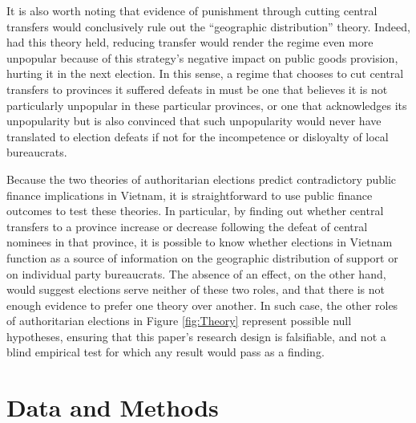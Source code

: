 \documentclass[12pt]{article}\usepackage[]{graphicx}\usepackage[]{color}
\newcommand{\1}{\mathbbm{1}}
\begin{document}
It is also worth noting that evidence of punishment through cutting central transfers would conclusively rule out the ``geographic distribution'' theory. Indeed, had this theory held, reducing transfer would render the regime even more unpopular because of this strategy's negative impact on public goods provision, hurting it in the next election. In this sense, a regime that chooses to cut central transfers to provinces it suffered defeats in must be one that believes it is not particularly unpopular in these particular provinces, or one that acknowledges its unpopularity but is also convinced that such unpopularity would never have translated to election defeats if not for the incompetence or disloyalty of local bureaucrats.

Because the two theories of authoritarian elections predict contradictory public finance implications in Vietnam, it is straightforward to use public finance outcomes to test these theories. In particular, by finding out whether central transfers to a province increase or decrease following the defeat of central nominees in that province, it is possible to know whether elections in Vietnam function as a source of information on the geographic distribution of support or on individual party bureaucrats. The absence of an effect, on the other hand, would suggest elections serve neither of these two roles, and that there is not enough evidence to prefer one theory over another. In such case, the other roles of authoritarian elections in Figure \ref{fig:Theory} represent possible null hypotheses, ensuring that this paper's research design is falsifiable, and not a blind empirical test for which any result would pass as a finding.

\section{Data and Methods}
\label{sec:methods}
\end{document}
